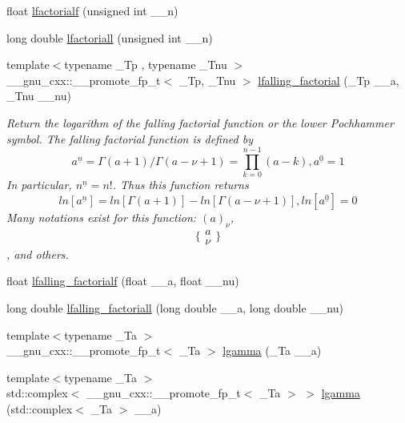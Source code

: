 \begin{DoxyCompactItemize}
float \hyperlink{group__gnu__math__spec__func_ga65af05c4093d4895a564a8d67e389a9b}{lfactorialf} (unsigned int \+\_\+\+\_\+n)
\item 
long double \hyperlink{group__gnu__math__spec__func_ga3a0c196f34916dc68c29c89f26cbe1ee}{lfactoriall} (unsigned int \+\_\+\+\_\+n)
\item 
{\footnotesize template$<$typename \+\_\+\+Tp , typename \+\_\+\+Tnu $>$ }\\\+\_\+\+\_\+gnu\+\_\+cxx\+::\+\_\+\+\_\+promote\+\_\+fp\+\_\+t$<$ \+\_\+\+Tp, \+\_\+\+Tnu $>$ \hyperlink{group__gnu__math__spec__func_ga7190df10af767718f1862e804a2d7129}{lfalling\+\_\+factorial} (\+\_\+\+Tp \+\_\+\+\_\+a, \+\_\+\+Tnu \+\_\+\+\_\+nu)
\begin{DoxyCompactList}\small\item\em Return the logarithm of the falling factorial function or the lower Pochhammer symbol. The falling factorial function is defined by \[ a^{\underline{n}} = \Gamma(a + 1) / \Gamma(a - \nu + 1) = \prod_{k=0}^{n-1} (a - k), a^{\underline{0}} = 1 \] In particular, $ n^{\underline{n}} = n! $. Thus this function returns \[ ln[a^{\underline{n}}] = ln[\Gamma(a + 1)] - ln[\Gamma(a - \nu + 1)], ln[a^{\underline{0}}] = 0 \] Many notations exist for this function\+: $ (a)_\nu $, \[ \{ \begin{array}{c} a \\ \nu \end{array} \} \], and others. \end{DoxyCompactList}\item 
float \hyperlink{group__gnu__math__spec__func_ga59ad7045c90aa1e3bc671e2eb6b8a2a7}{lfalling\+\_\+factorialf} (float \+\_\+\+\_\+a, float \+\_\+\+\_\+nu)
\item 
long double \hyperlink{group__gnu__math__spec__func_gaa69b6c70e000b073d7f0f17199b1feb0}{lfalling\+\_\+factoriall} (long double \+\_\+\+\_\+a, long double \+\_\+\+\_\+nu)
\item 
{\footnotesize template$<$typename \+\_\+\+Ta $>$ }\\\+\_\+\+\_\+gnu\+\_\+cxx\+::\+\_\+\+\_\+promote\+\_\+fp\+\_\+t$<$ \+\_\+\+Ta $>$ \hyperlink{group__gnu__math__spec__func_ga3a5c8ad2a513470bd71be1bb14439945}{lgamma} (\+\_\+\+Ta \+\_\+\+\_\+a)
\item 
{\footnotesize template$<$typename \+\_\+\+Ta $>$ }\\std\+::complex$<$ \+\_\+\+\_\+gnu\+\_\+cxx\+::\+\_\+\+\_\+promote\+\_\+fp\+\_\+t$<$ \+\_\+\+Ta $>$ $>$ \hyperlink{group__gnu__math__spec__func_gaf70747491390b1bfc27b93ff4be6376e}{lgamma} (std\+::complex$<$ \+\_\+\+Ta $>$ \+\_\+\+\_\+a)

\end{DoxyCompactItemize}
